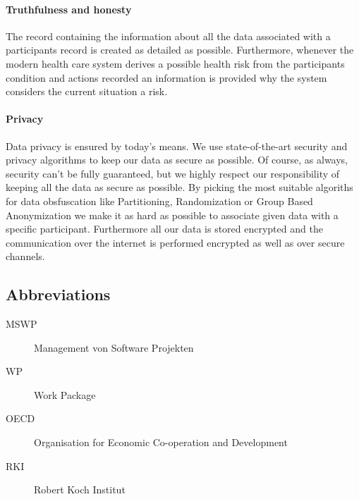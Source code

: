 \documentclass[a4paper,11pt]{article}
\begin{document}
\paragraph{Truthfulness and honesty}
The record containing the information about all the data associated with a participants record is created as detailed as possible. Furthermore, whenever the modern health care system derives a possible health risk from the participants condition and actions recorded an information is provided why the system considers the current situation a risk.

\paragraph{Privacy}
Data privacy is ensured by today's means. We use state-of-the-art security and privacy algorithms to keep our data as secure as possible. Of course, as always, security can't be fully guaranteed, but we highly respect our responsibility of keeping all the data as secure as possible. By picking the most suitable algoriths for data obsfuscation like Partitioning, Randomization or Group Based Anonymization we make it as hard as possible to associate given data with a specific participant. Furthermore all our data is stored encrypted and the communication over the internet is performed encrypted as well as over secure channels.

\begin{appendix}

\pagebreak

{}


\nocite{*}



\pagebreak

\section*{Abbreviations}
 
 \begin{description}
  \item[MSWP] Management von Software Projekten
  \item[WP] Work Package
  \item[OECD] Organisation for Economic Co-operation and Development
  \item[RKI] Robert Koch Institut
 \end{description}

\end{appendix}
\end{document}
